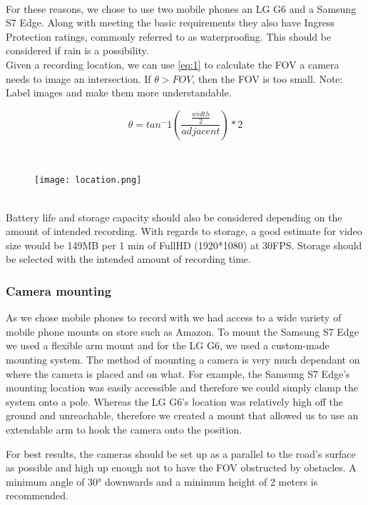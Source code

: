 \ \\
For these reasons, we chose to use two mobile phones an LG G6 and a Samsung S7 Edge. Along with meeting the basic requirements they also have Ingress Protection ratings, 
commonly referred to as waterproofing. This should be considered if rain is a possibility.
\ \\

Given a recording location, we can use \ref{eq:1} to calculate the FOV a camera needs to image an intersection.
If $\theta > FOV$, then the FOV is too small.
\color{red}
Note: Label images and make them more understandable.
\color{black}

\begin{equation}
    \theta = tan^-1(\frac{\frac{width}{2}}{adjacent}) * 2\label{eq:1}
  \end{equation}

\ \\ 
\begin{figure}[h]
\texttt{[image: location.png]}
\centering 
\end{figure}
\label{Camera location}

\ \\
Battery life and storage capacity should also be considered depending on the amount of intended recording. 
With regards to storage, a good estimate for video size would be 149MB per 1 min of FullHD (1920*1080) at 30FPS. Storage should be selected
with the intended amount of recording time.

\subsubsection{Camera mounting}

As we chose mobile phones to record with we had access to a wide variety of mobile phone mounts on store such as Amazon.
To mount the Samsung S7 Edge we used a flexible arm mount and for the LG G6, we used a custom-made mounting system.
The method of mounting a camera is very much dependant on where the camera is placed and on what. For example, the Samsung S7 Edge's
mounting location was easily accessible and therefore we could simply clamp the system onto a pole. Whereas the LG G6's location was relatively high off the ground and unreachable, therefore we created a mount that allowed us to use an extendable arm to hook the camera onto the position.

For best results, the cameras should be set up as a parallel to the road's surface as possible and high up enough not to have the FOV obstructed by obstacles.
A minimum angle of 30° downwards and a minimum height of 2 meters is recommended.

